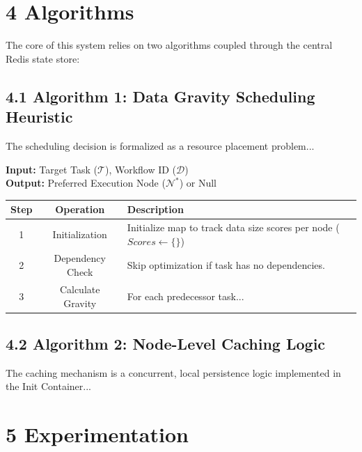 \documentclass[12pt,a4paper]{report}
\begin{document}
\chapter{4 \hspace{0.2cm} Algorithms}
The core of this system relies on two algorithms coupled through the central Redis state store:

\section*{4.1 Algorithm 1: Data Gravity Scheduling Heuristic}

The scheduling decision is formalized as a resource placement problem...
\vspace{0.3cm}

\noindent \textbf{Input:} Target Task ($\mathcal{T}$), Workflow ID ($\mathcal{D}$) \\
\textbf{Output:} Preferred Execution Node ($\mathcal{N}^*$) or Null

\begin{table}[h]
\centering
\begin{tabular}{|c|c|p{9cm}|}
\hline
\textbf{Step} & \textbf{Operation} & \textbf{Description} \\
\hline
1 & Initialization & Initialize map to track data size scores per node ($Scores \leftarrow \{\}$) \\
\hline
2 & Dependency Check & Skip optimization if task has no dependencies. \\
\hline
3 & Calculate Gravity & For each predecessor task... \\
\hline
\end{tabular}
\end{table}

\section*{4.2 Algorithm 2: Node-Level Caching Logic}
The caching mechanism is a concurrent, local persistence logic implemented in the Init Container...

\chapter{5 \hspace{0.2cm} Experimentation}
\end{document}
